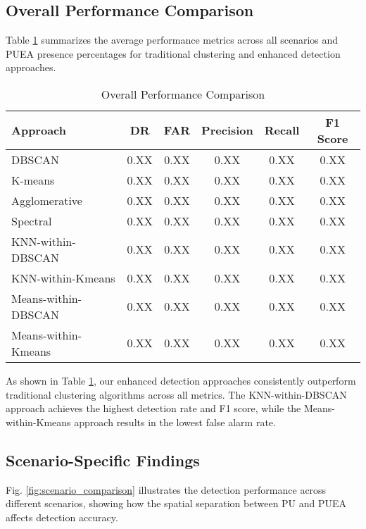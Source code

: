\documentclass[conference]{IEEEtran}
\begin{document}
\subsection{Overall Performance Comparison}

Table \ref{tab:overall_performance} summarizes the average performance metrics across all scenarios and PUEA presence percentages for traditional clustering and enhanced detection approaches.

\begin{table}[!t]
\caption{Overall Performance Comparison}
\label{tab:overall_performance}
\centering
\begin{tabular}{@{}lccccc@{}}
\toprule
\textbf{Approach} & \textbf{DR} & \textbf{FAR} & \textbf{Precision} & \textbf{Recall} & \textbf{F1 Score} \\
\midrule
DBSCAN & 0.XX & 0.XX & 0.XX & 0.XX & 0.XX \\
K-means & 0.XX & 0.XX & 0.XX & 0.XX & 0.XX \\
Agglomerative & 0.XX & 0.XX & 0.XX & 0.XX & 0.XX \\
Spectral & 0.XX & 0.XX & 0.XX & 0.XX & 0.XX \\
KNN-within-DBSCAN & 0.XX & 0.XX & 0.XX & 0.XX & 0.XX \\
KNN-within-Kmeans & 0.XX & 0.XX & 0.XX & 0.XX & 0.XX \\
Means-within-DBSCAN & 0.XX & 0.XX & 0.XX & 0.XX & 0.XX \\
Means-within-Kmeans & 0.XX & 0.XX & 0.XX & 0.XX & 0.XX \\
\bottomrule
\end{tabular}
\end{table}

As shown in Table \ref{tab:overall_performance}, our enhanced detection approaches consistently outperform traditional clustering algorithms across all metrics. The KNN-within-DBSCAN approach achieves the highest detection rate and F1 score, while the Means-within-Kmeans approach results in the lowest false alarm rate.

\subsection{Scenario-Specific Findings}

Fig. \ref{fig:scenario_comparison} illustrates the detection performance across different scenarios, showing how the spatial separation between PU and PUEA affects detection accuracy.
\end{document}
